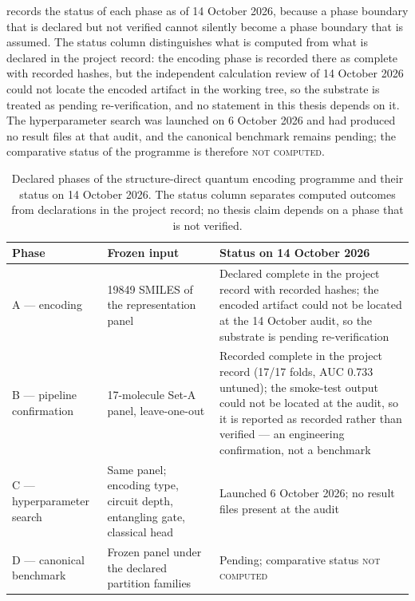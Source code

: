  records the status of each phase as of 14 October 2026, because a phase boundary that is declared but not verified cannot silently become a phase boundary that is assumed. The status column distinguishes what is computed from what is declared in the project record: the encoding phase is recorded there as complete with recorded hashes, but the independent calculation review of 14 October 2026 could not locate the encoded artifact in the working tree, so the substrate is treated as pending re-verification, and no statement in this thesis depends on it. The hyperparameter search was launched on 6 October 2026 and had produced no result files at that audit, and the canonical benchmark remains pending; the comparative status of the programme is therefore \textsc{not computed}.

\begin{table}[htbp]
	\centering
	\caption[Declared phases of the structure-direct programme]{Declared phases of the structure-direct quantum encoding programme and their status on 14 October 2026. The status column separates computed outcomes from declarations in the project record; no thesis claim depends on a phase that is not verified.}
	\label{tab:met_qmse_phases}
	\small
	\begin{tabularx}{\textwidth}{l X X}
		\toprule
		Phase & Frozen input & Status on 14 October 2026 \\
		\midrule
		A --- encoding & \num{19849} SMILES of the representation panel & Declared complete in the project record with recorded hashes; the encoded artifact could not be located at the 14 October audit, so the substrate is pending re-verification \\
		B --- pipeline confirmation & \num{17}-molecule Set-A panel, leave-one-out & Recorded complete in the project record (\num{17}/\num{17} folds, AUC \num{0.733} untuned); the smoke-test output could not be located at the audit, so it is reported as recorded rather than verified --- an engineering confirmation, not a benchmark \\
		C --- hyperparameter search & Same panel; encoding type, circuit depth, entangling gate, classical head & Launched 6 October 2026; no result files present at the audit \\
		D --- canonical benchmark & Frozen panel under the declared partition families & Pending; comparative status \textsc{not computed} \\
		\bottomrule
	\end{tabularx}
\end{table}


